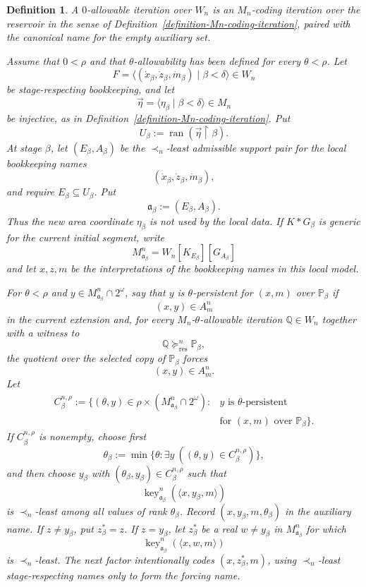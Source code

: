 \documentclass[a4paper,11pt]{article}
\newtheorem{definition}[theorem]{Definition}
\newcommand{\forceP}{\mathbb{P}}
\newcommand{\forceQ}{\mathbb{Q}}
\newcommand{\key}{\operatorname{key}}
\begin{document}
\begin{definition}
\label{definition-Mn-alpha-allowability}
A $0$-allowable iteration over $W_n$ is an $M_n$-coding iteration over the
reservoir in the sense of
Definition~\ref{definition-Mn-coding-iteration}, paired with the canonical
name for the empty auxiliary set.

Assume that $0<\rho$ and that $\theta$-allowability has been defined for every
$\theta<\rho$.  Let
\[
   F=\langle(\dot x_\beta,\dot z_\beta,\dot m_\beta)
      \mid\beta<\delta\rangle\in W_n
\]
be stage-respecting bookkeeping, and let
\[
   \vec\eta=\langle\eta_\beta\mid\beta<\delta\rangle\in M_n
\]
be injective, as in Definition~\ref{definition-Mn-coding-iteration}.  Put
\[
   U_\beta:=\operatorname{ran}(\vec\eta\restriction\beta).
\]
At stage $\beta$, let $(E_\beta,A_\beta)$ be the $\prec_n$-least admissible
support pair for the local bookkeeping names
\[
   (\dot x_\beta,\dot z_\beta,\dot m_\beta),
\]
and require $E_\beta\subseteq U_\beta$.  Put
\[
   \mathfrak a_\beta:=(E_\beta,A_\beta).
\]
Thus the new area coordinate $\eta_\beta$ is not used by the local data.  If
$K*G_\beta$ is generic for the current initial segment, write
\[
   M^n_{\mathfrak a_\beta}=W_n[K_{E_\beta}][G_{A_\beta}]
\]
and let $x,z,m$ be the interpretations of the bookkeeping names in this local
model.

For $\theta<\rho$ and $y\in M^n_{\mathfrak a_\beta}\cap2^\omega$, say that
$y$ is $\theta$-persistent for $(x,m)$ over $\forceP_\beta$ if
\[
   (x,y)\in A^n_m
\]
in the current extension and, for every $M_n$-$\theta$-allowable iteration
$\forceQ\in W_n$ together with a witness to
\[
   \forceQ\succeq^n_{\mathrm{res}}\forceP_\beta,
\]
the quotient over the selected copy of $\forceP_\beta$ forces
\[
   (x,y)\in A^n_m.
\]
Let
\[
\begin{aligned}
   C^{n,\rho}_\beta
   :=\{(\theta,y)\in
      \rho\times(M^n_{\mathfrak a_\beta}\cap2^\omega):{}&
      y\text{ is }\theta\text{-persistent}\\
      &\text{for }(x,m)\text{ over }\forceP_\beta\}.
\end{aligned}
\]
If $C^{n,\rho}_\beta$ is nonempty, choose first
\[
   \theta_\beta
   :=\min\{\theta:\exists y\ ((\theta,y)\in C^{n,\rho}_\beta)\},
\]
and then choose $y_\beta$ with $(\theta_\beta,y_\beta)\in C^{n,\rho}_\beta$
such that
\[
   \key^n_{\mathfrak a_\beta}(\langle x,y_\beta,m\rangle)
\]
is $\prec_n$-least among all values of rank $\theta_\beta$.  Record
$(x,y_\beta,m,\theta_\beta)$ in the auxiliary name.  If $z\neq y_\beta$, put
$z_\beta^*=z$.  If $z=y_\beta$, let $z_\beta^*$ be a real
$w\neq y_\beta$ in $M^n_{\mathfrak a_\beta}$ for which
\[
   \key^n_{\mathfrak a_\beta}(\langle x,w,m\rangle)
\]
is $\prec_n$-least.  The next factor intentionally codes
$(x,z_\beta^*,m)$, using $\prec_n$-least stage-respecting names only to form
the forcing name.


\end{definition}
\end{document}

